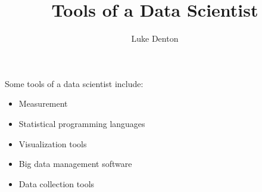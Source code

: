 \documentclass{homeworg}
\title{Tools of a Data Scientist}
\author{Luke Denton}
\begin{document}
\maketitle

\exercise
Some tools of a data scientist include:
\begin{itemize}
    \item Measurement
    \item Statistical programming languages
    \item Visualization tools
    \item Big data management software
    \item Data collection tools
\end{itemize}
\end{document}
